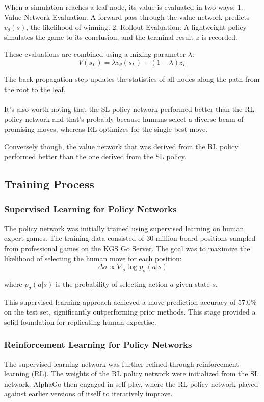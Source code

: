 When a simulation reaches a leaf node, its value is evaluated in two ways: 1.
Value Network Evaluation: A forward pass through the value network predicts \(
v_\theta(s) \), the likelihood of winning. 2. Rollout Evaluation: A lightweight
policy simulates the game to its conclusion, and the terminal result \( z \) is
recorded.

These evaluations are combined using a mixing parameter \( \lambda \):
\begin{equation}
    V(s_L) = \lambda v_\theta(s_L) + (1 - \lambda) z_L
\end{equation}

The back propagation step updates the statistics of all nodes along the path
from the root to the leaf. \\\\ It's also worth noting that the SL policy
network performed better than the RL policy network and that's probably because
humans select a diverse beam of promising moves, whereas RL optimizes for the
single best move.

Conversely though, the value network that was derived from the RL policy
performed better than the one derived from the SL policy.
\subsection{Training Process}

\subsubsection{Supervised Learning for Policy Networks}
The policy network was initially trained using supervised learning on human
expert games. The training data consisted of 30 million board positions sampled
from professional games on the KGS Go Server. The goal was to maximize the
likelihood of selecting the human move for each position:
\begin{equation}
    \Delta \sigma \propto \nabla_\sigma \log p_\sigma(a | s)
\end{equation}

where \( p_\sigma(a | s) \) is the probability of selecting action \( a \)
given state \( s \).

This supervised learning approach achieved a move prediction accuracy of 57.0\%
on the test set, significantly outperforming prior methods. This stage provided
a solid foundation for replicating human expertise.

\subsubsection{Reinforcement Learning for Policy Networks}
The supervised learning network was further refined through reinforcement
learning (RL). The weights of the RL policy network were initialized from the
SL network. AlphaGo then engaged in self-play, where the RL policy network
played against earlier versions of itself to iteratively improve.


